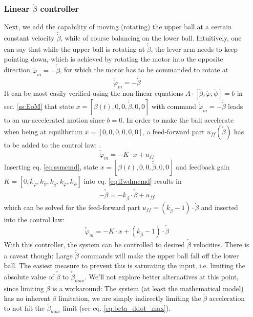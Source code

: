 \documentclass{article}
\begin{document}
\subsubsection{Linear $\dot{\beta}$ controller}
Next, we add the capability of moving (rotating) the upper ball at a certain constant velocity $\breve{\dot{\beta}}$, while of course balancing on the lower ball.
Intuitively, one can say that while the upper ball is rotating at $\breve{\dot{\beta}}$, the lever arm needs to keep pointing down, which is achieved by rotating the motor into the opposite direction $\dot{\varphi}_m = -\breve{\dot{\beta}}$, for which the motor has to be commanded to rotate at
\begin{equation}
\breve{\dot{\varphi}}_m = -\breve{\dot{\beta}}
\label{eq:ssmcmd}
\end{equation}
It can be most easily verified using the non-linear equations $A \cdot [\ddot{\beta}, \ddot{\varphi}, \ddot{\psi}] = b$ in sec. \ref{ss:EoM} that state $x = [\beta(t), 0, 0, \breve{\dot{\beta}}, 0, 0]$ with command $\breve{\dot{\varphi}}_m = -\breve{\dot{\beta}}$ leads to an un-accelerated motion since $b=0$.
In order to make the ball accelerate when being at equilibrium $x=[0,0,0,0,0,0]$, a feed-forward part $u_{ff} \left( \breve{\dot{\beta}} \right)$ has to be added to the control law: .
\begin{equation}
\breve{\dot{\varphi}}_m=-K \cdot x + u_{ff}
\label{eq:ffwdmcmd}
\end{equation}
Inserting eq. \ref{eq:ssmcmd}, state $x = [\beta(t), 0, 0, \breve{\dot{\beta}}, 0, 0]$ and feedback gain \newline $K = \left[0, k_{\varphi}, k_{\psi}, k_{\dot{\beta}}, k_{\dot{\varphi}}, k_{\dot{\psi}} \right]$ into eq. \ref{eq:ffwdmcmd} results in
\begin{equation}
-\breve{\dot{\beta}} = -k_{\dot{\beta}} \cdot \breve{\dot{\beta}}  + u_{ff}
\end{equation}
which can be solved for the feed-forward part $u_{ff} = (k_{\dot{\beta}} - 1 ) \cdot \breve{\dot{\beta}}$ and inserted into the control law:
\begin{equation}
\breve{\dot{\varphi}}_m=-K \cdot x + \left(k_{\dot{\beta}} - 1 \right) \cdot \breve{\dot{\beta}}
\label{eq:betadotctrl}
\end{equation}
With this controller, the system can be controlled to desired $\breve{\dot{\beta}}$ velocities.
There is a caveat though: Large $\breve{\dot{\beta}}$ commands will make the upper ball fall off the lower ball.
The easiest measure to prevent this is saturating the input, i.e. limiting the absolute value of $\breve{\dot{\beta}}$ to $\breve{\dot{\beta}}_{max}$.
We'll not explore better alternatives at this point, since limiting $\breve{\dot{\beta}}$ is a workaround:
The system (at least the mathematical model) has no inherent $\dot{\beta}$ limitation, we are simply indirectly limiting the $\ddot{\beta}$ acceleration to not hit the $\ddot{\beta}_{max}$ limit (see eq. \ref{eq:beta_ddot_max}).
\end{document}
